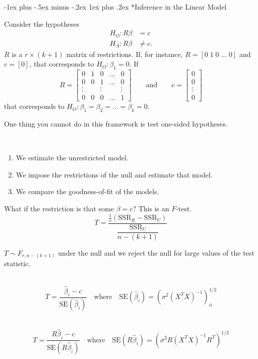 \documentclass[a4paper,10pt,landscape]{article}
\makeatletter
\renewcommand{\subsubsection}{\@startsection{subsubsection}{3}{0mm}%
                                {-1ex plus -.5ex minus -.2ex}%
                                {1ex plus .2ex}%
                                {\normalfont\small\bfseries}}
\makeatother
\begin{document}
\begin{multicols*}{3}
\subsubsection*{Inference in the Linear Model}
\begin{description}
	\item Consider the hypotheses
	\begin{align*}
		H_O: R\beta&=c\\
		H_A: R\beta&\neq c.
	\end{align*}
	$R$ is a $r\times(k+1)$ matrix of restrictions. If, for instance, $R=[0\;1\;0\;\dots\;0]$ and $c=[0]$, that corresponds to $H_O: \beta_1=0$. If
	$$ R=
	\begin{bmatrix}
		0 & 1 & 0 & \dots & 0\\
		0 & 0 & 1 & \dots & 0\\
		\vdots & & \vdots & & \vdots\\
		0 & 0 & 0 & \dots & 1
	\end{bmatrix}\qquad\text{and}\qquad c=
	\begin{bmatrix}
		0\\
		0\\
		\vdots\\
		0
	\end{bmatrix}$$
	that corresponds to $H_O: \beta_1=\beta_2=\dots=\beta_k=0.$
	\item One thing you cannot do in this framework is test one-sided hypotheses.
	\item[Steps:] ~
	\begin{enumerate}[itemsep=0pt]
		\item We estimate the unrestricted model.
		\item We impose the restrictions of the null and estimate that model.
		\item We compare the goodness-of-fit of the models.
	\end{enumerate}
	\item What if the restriction is that some $\beta=c$? This is an $F$-test.
	$$T=\dfrac{\frac{1}{r}\left(\text{SSR}_R-\text{SSR}_U\right)}{\dfrac{\text{SSR}_U}{n-(k+1)}}$$
	\item $T\sim F_{r,n-(k+1)}$ under the null and we reject the null for large values of the test statistic.
	\item[$H_O: \beta_i=c$] ~
	$$T=\dfrac{\hat{\beta}_i-c}{\text{SE}\left(\hat{\beta}_i\right)}\quad\text{where}\quad\text{SE}\left(\hat{\beta}_i\right)=\left(\sigma^2(X^TX)^{-1}\right)^{1/2}_{ii}$$
	\item[$H_O: R\beta=c$] ~
	$$T=\dfrac{R\hat{\beta}_i-c}{\text{SE}\left(R\hat{\beta}_i\right)}\quad\text{where}\quad\text{SE}\left(R\hat{\beta}_i\right)=\left(\sigma^2R(X^TX)^{-1}R^T\right)^{1/2}$$
\end{description}

\end{multicols*}
\end{document}
